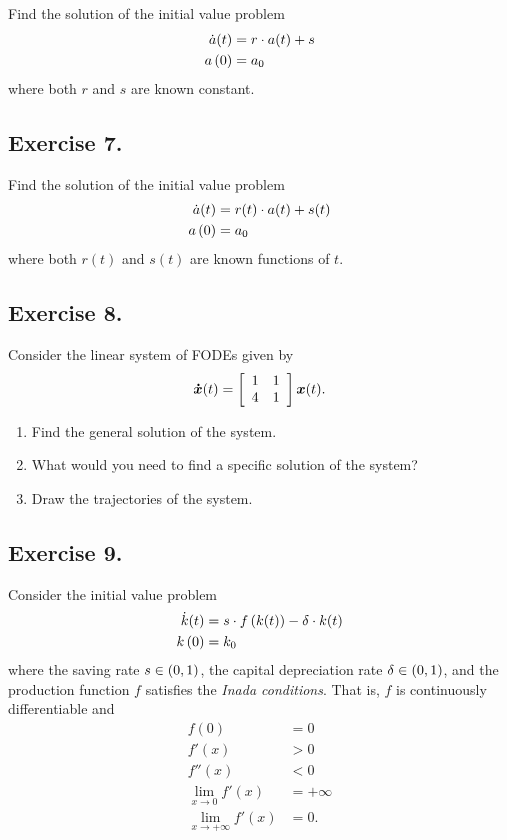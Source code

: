 \documentclass[letterpaper,12pt,leqno]{article}
\begin{document}
Find the solution of the initial value problem 
\begin{align*}
\dot{a}(t) &=r\cdot a(t) +s \\
a\left( 0 \right) &=a_{0}
\end{align*}
where both $r$ and $s$ are known constant.

\subsection*{Exercise 7.}

Find the solution of the initial value problem 
\begin{align*}
\dot{a}(t) &=r(t)\cdot a(t) +s(t) \\
a\left( 0 \right) &=a_{0}
\end{align*}
where both  $r(t)$ and $s(t)$ are known functions of $t.$

\subsection*{Exercise 8.}

Consider the linear system of FODEs given by
\begin{equation*}
\bm{\dot{x}}(t)=\left[ 
\begin{array}{ll}
1 & 1 \\ 
4 & 1
\end{array} \right] \bm{x}(t).
\end{equation*}
\begin{enumerate}
\item Find the general solution of the system.
\item What would you need to find a specific solution of the system?
\item Draw the trajectories of the system.
\end{enumerate}

\subsection*{Exercise 9.}

Consider the initial value problem 
\begin{align*}
\dot{k}(t) &=s\cdot f\left( k(t) \right) -\delta\cdot  k(t) \\
k\left( 0 \right) &=k_{0}
\end{align*}
where the saving rate $s\in \left( 0,1 \right) $, the capital depreciation rate $\delta \in \left( 0,1 \right)$, and the production function $f$ satisfies the \textit{Inada conditions}. That is, $f$ is continuously differentiable and 
\begin{align*}
f(0)&=0\\
f'(x)&>0\\
f''(x)&<0\\
\lim_{x\to 0} f'(x)&=+\infty\\
\lim_{x\to +\infty} f'(x)&=0.
\end{align*}
\end{document}
